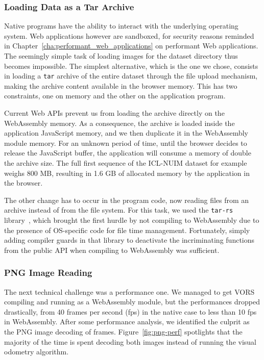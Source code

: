 \subsubsection{Loading Data as a Tar Archive}%

Native programs have the ability to interact with the underlying operating system.
Web applications however are sandboxed, for security reasons reminded
in Chapter~\ref{cha:performant_web_applications} on performant Web applications.
The seemingly simple task of loading images for the dataset directory
thus becomes impossible.
The simplest alternative, which is the one we chose,
consists in loading a \verb|tar| archive of the entire dataset through
the file upload mechanism, making the archive content available in the browser memory.
This has two constraints, one on memory and the other on the application program.

Current Web APIs prevent us from loading the archive directly on the WebAssembly memory.
As a consequence, the archive is loaded inside the application JavaScript memory,
and we then duplicate it in the WebAssembly module memory.
For an unknown period of time, until the browser decides to release the JavaScript buffer,
the application will consume a memory of double the archive size.
The full first sequence of the ICL-NUIM dataset for example weighs 800 MB,
resulting in 1.6 GB of allocated memory by the application in the browser.

The other change has to occur in the program code, now reading files from an archive
instead of from the file system.
For this task, we used the \verb|tar-rs| library~\cite{tar-rs},
which brought the first hurdle by not compiling to WebAssembly
due to the presence of OS-specific code for file time management.
Fortunately, simply adding compiler guards in that library to deactivate
the incriminating functions from the public API when compiling to WebAssembly was sufficient.

\subsubsection{PNG Image Reading}%

The next technical challenge was a performance one.
We managed to get VORS compiling and running as a WebAssembly module,
but the performances dropped drastically, from 40 frames per second (fps)
in the native case to less than 10 fps in WebAssembly.
After some performance analysis, we identified the culprit as
the PNG image decoding of frames.
Figure~\ref{fig:png-perf} spotlights that the majority of the time
is spent decoding both images instead of running the visual odometry algorithm.

